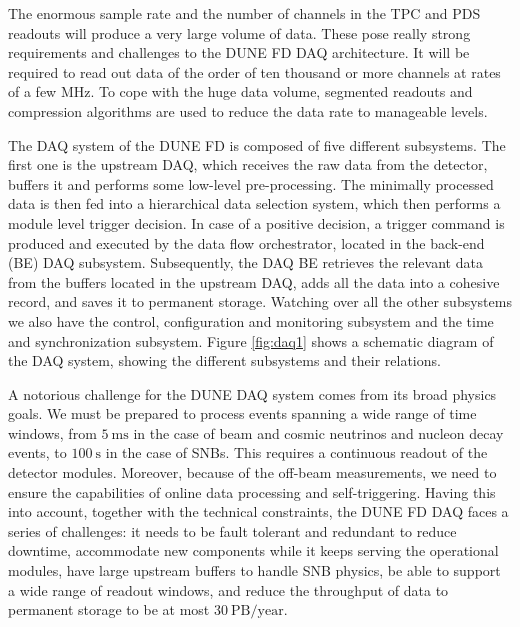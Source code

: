 The enormous sample rate and the number of channels in the TPC and PDS readouts will produce a very large volume of data. These pose really strong requirements and challenges to the DUNE FD DAQ architecture. It will be required to read out data of the order of ten thousand or more channels at rates of a few MHz. To cope with the huge data volume, segmented readouts and compression algorithms are used to reduce the data rate to manageable levels.

The DAQ system of the DUNE FD is composed of five different subsystems. The first one is the upstream DAQ, which receives the raw data from the detector, buffers it and performs some low-level pre-processing. The minimally processed data is then fed into a hierarchical data selection system, which then performs a module level trigger decision. In case of a positive decision, a trigger command is produced and executed by the data flow orchestrator, located in the back-end (BE) DAQ subsystem. Subsequently, the DAQ BE retrieves the relevant data from the buffers located in the upstream DAQ, adds all the data into a cohesive record, and saves it to permanent storage. Watching over all the other subsystems we also have the control, configuration and monitoring subsystem and the time and synchronization subsystem. Figure \ref{fig:daq1} shows a schematic diagram of the DAQ system, showing the different subsystems and their relations.

A notorious challenge for the DUNE DAQ system comes from its broad physics goals. We must be prepared to process events spanning a wide range of time windows, from $5 \ \mathrm{ms}$ in the case of beam and cosmic neutrinos and nucleon decay events, to $100 \ \mathrm{s}$ in the case of SNBs. This requires a continuous readout of the detector modules. Moreover, because of the off-beam measurements, we need to ensure the capabilities of online data processing and self-triggering. Having this into account, together with the technical constraints, the DUNE FD DAQ faces a series of challenges: it needs to be fault tolerant and redundant to reduce downtime, accommodate new components while it keeps serving the operational modules, have large upstream buffers to handle SNB physics, be able to support a wide range of readout windows, and reduce the throughput of data to permanent storage to be at most $30 \ \mathrm{PB/year}$.
